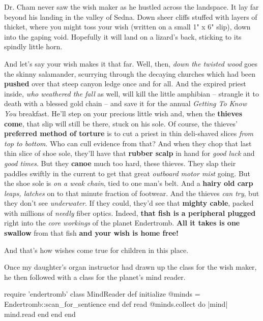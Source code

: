 \documentclass[12pt,twoside]{report}
\begin{document}
Dr. Cham never saw the wish maker as he hustled across the
landspace. It lay far beyond his landing in the valley of Sedna.  Down
sheer cliffs stuffed with layers of thicket, where you might toss your
wish (written on a small 1" x 6" slip), down into the gaping void.
Hopefully it will land on a lizard's back, sticking to its spindly
little horn.

And let's say your wish makes it that far.  Well, then, {\em down the
  twisted wood} goes the skinny salamander, scurrying through the
decaying churches which had been {\bf pushed} over that steep canyon
ledge once and for all.  And the expired priest inside, {\em who
  weathered the fall} as well, will kill the little amphibian --
strangle it to death with a blessed gold chain -- and save it for the
annual {\em Getting To Know You} breakfast.  He'll step on your
precious little wish and, when the {\bf thieves come}, that slip will
still be there, stuck on his sole.  Of course, the thieves' {\bf
  preferred method of torture} is to cut a priest in thin deli-shaved
slices {\em from top to bottom}.  Who can cull evidence from that?
And when they chop that last thin slice of shoe sole, they'll have
that {\bf rubber scalp} in hand for {\em good luck} and {\em good
  times}. But they {\bf canoe} much too hard, these thieves.  They
slap their paddles swiftly in the current to get that great {\em
  outboard motor mist} going.  But the shoe sole is {\em on a weak
  chain}, tied to one man's belt.  And a {\bf hairy old carp} {\em
  leaps, latches} on to that minute fraction of footwear.  And the
thieves {\em can try}, but they don't see {\em underwater}.  If they
could, they'd see that {\bf mighty cable}, packed with millions of
{\em needly} fiber optics.  Indeed, {\bf that fish is a peripheral
  plugged} right into the {\em core workings} of the planet
Endertromb.  {\bf All it takes is one swallow} from that fish {\bf and
  your wish is home free!}

And that's how wishes come true for children in this place.

Once my daughter's organ instructor had drawn up the class for the
wish maker, he then followed with a class for the planet's mind
reader.


\begin{rubycode}

 require 'endertromb'
 class MindReader
   def initialize
     @minds = Endertromb::scan_for_sentience
   end
   def read
     @minds.collect do |mind|
        mind.read
     end
   end
 end

\end{rubycode}
\end{document}
